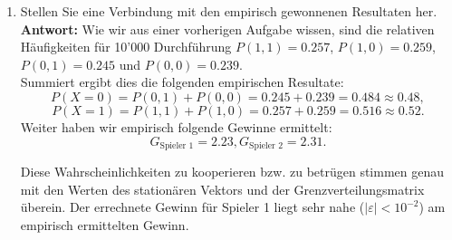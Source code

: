 \documentclass[12pt,a4paper]{article}
\begin{document}
\begin{enumerate}
\begin{enumerate}
\item Stellen Sie eine Verbindung mit den empirisch gewonnenen Resultaten her.\\
\textbf{Antwort:} Wie wir aus einer vorherigen Aufgabe wissen, sind die relativen Häufigkeiten für 10'000 Durchführung $P(1, 1) = 0.257$, $P(1, 0) = 0.259$, $P(0, 1) = 0.245$ und $P(0, 0) = 0.239$.\\
Summiert ergibt dies die folgenden empirischen Resultate:
$$P(X = 0) = P(0, 1) + P(0, 0) = 0.245 + 0.239 = 0.484 \approx 0.48,$$
$$P(X = 1) = P(1, 1) + P(1, 0) = 0.257 + 0.259 = 0.516 \approx 0.52.$$
Weiter haben wir empirisch folgende Gewinne ermittelt:
$$G_{\text{Spieler 1}}=2.23, G_{\text{Spieler 2}}=2.31.$$

Diese Wahrscheinlichkeiten zu kooperieren bzw. zu betrügen stimmen genau mit den Werten des stationären Vektors und der Grenzverteilungsmatrix überein.
Der errechnete Gewinn für Spieler 1 liegt sehr nahe ($|\varepsilon|<10^{-2}$) am empirisch ermittelten Gewinn.
\end{enumerate}
\newpage


\end{enumerate}
\end{document}
